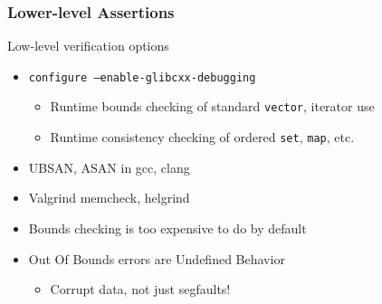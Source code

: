 \begin{frame}
\frametitle{Lower-level Assertions}
  \begin{block}{Low-level verification options}
\begin{itemize}
\item \texttt{configure --enable-glibcxx-debugging}
\begin{itemize}
\item Runtime bounds checking of standard \texttt{vector},
iterator use
\item Runtime consistency checking of ordered \texttt{set},
  \texttt{map}, etc.
\end{itemize}
\item UBSAN, ASAN in gcc, clang
\item Valgrind memcheck, helgrind
\item Bounds checking is too expensive to do by default
\item Out Of Bounds errors are Undefined Behavior
\begin{itemize}
  \item Corrupt data, not just segfaults!
\end{itemize}
\end{itemize}
\end{block}

\end{frame}


